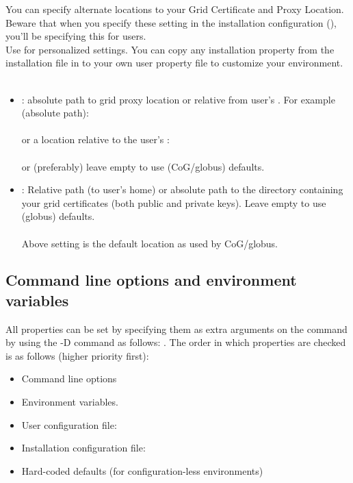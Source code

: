 You can specify alternate locations to your Grid Certificate and Proxy Location.
Beware that when you specify these setting in the installation configuration
(), you'll be specifying this for  users.\\
Use  for personalized settings. You can copy
any installation property from the installation file in to your own user
property file to customize your environment. \\
\\
\begin{itemize}  
   \item {}: absolute path to grid proxy location or
   relative from user's \HOME. For example (absolute path):\\
   
   \tab {}\\
   
   or a location relative to the user's \HOME:\\
    
   \tab {}\\

   or (preferably) leave empty to use (CoG/globus) defaults. 
   
   \item {}: Relative path (to user's home)
   or absolute path to the directory containing your grid certificates (both
   public and private keys). Leave empty to use (globus) defaults. \\
    
   \tab {}\\
   
   Above setting is the default location as used by CoG/globus. 
  
\end{itemize} 


\subsection{Command line options and environment variables}

All properties can be set by specifying them as extra arguments on the command
by using the -D command as follows: .
The order in which properties are checked is as follows (higher priority first):

\begin {itemize}
  \item Command line options 
  \item Environment variables. 
  \item User configuration file: \VLETUSERCONF 
  \item Installation configuration file: \VLETCONF 
  \item Hard-coded defaults (for configuration-less environments)
\end{itemize}

